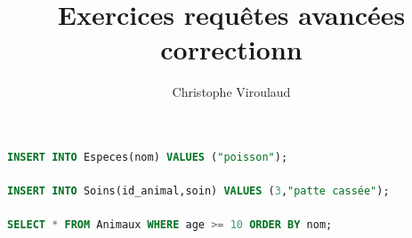 \documentclass[svgnames,11pt]{beamer}
\author[]{Christophe Viroulaud}
\title{Exercices requêtes avancées\\correctionn}
\date{\framebox{\textbf{BDD 07}}}
\institute{Terminale - NSI}
\begin{document}
\begin{frame}
\titlepage
\end{frame}
\begin{frame}[fragile]
    \frametitle{}

\begin{center}
\begin{lstlisting}[language=SQL , basicstyle=\ttfamily\small, xleftmargin=1em, xrightmargin=0em]
INSERT INTO Especes(nom) VALUES ("poisson");
\end{lstlisting}
\label{CODE}
\end{center}

\end{frame}
\begin{frame}[fragile]
    \frametitle{}

\begin{center}
\begin{lstlisting}[language=SQL , basicstyle=\ttfamily\small, xleftmargin=1em, xrightmargin=0em]
INSERT INTO Soins(id_animal,soin) VALUES (3,"patte cassée");
\end{lstlisting}
\label{CODE}
\end{center}

\end{frame}
\begin{frame}[fragile]
    \frametitle{}

\begin{center}
\begin{lstlisting}[language=SQL , basicstyle=\ttfamily\small, xleftmargin=1em, xrightmargin=0em]
SELECT * FROM Animaux WHERE age >= 10 ORDER BY nom;
\end{lstlisting}
\label{CODE}
\end{center}

\end{frame}
\end{document}
